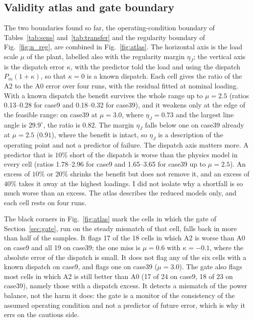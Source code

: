 \documentclass[preprint,12pt]{elsarticle}
\begin{document}
\subsection{Validity atlas and gate boundary}
\label{sec:atlas}
The two boundaries found so far, the operating-condition boundary of Tables~\ref{tab:sens} and~\ref{tab:transfer} and the regularity boundary of Fig.~\ref{fig:n_reg}, are combined in Fig.~\ref{fig:atlas}. The horizontal axis is the load scale $\mu$ of the plant, labelled also with the regularity margin $\eta_J$; the vertical axis is the dispatch error $\kappa$, with the predictor told the load and using the dispatch $P_m(1+\kappa)$, so that $\kappa=0$ is a known dispatch. Each cell gives the ratio of the A2 to the A0 error over four runs, with the residual fitted at nominal loading. With a known dispatch the benefit survives the whole range up to $\mu=2.5$ (ratios 0.13--0.28 for case9 and 0.18--0.32 for case39), and it weakens only at the edge of the feasible range: on case39 at $\mu=3.0$, where $\eta_J=0.73$ and the largest line angle is $29.9^\circ$, the ratio is $0.82$. The margin $\eta_J$ falls below one on case39 already at $\mu=2.5$ ($0.91$), where the benefit is intact, so $\eta_J$ is a description of the operating point and not a predictor of failure. The dispatch axis matters more. A predictor that is $10\%$ short of the dispatch is worse than the physics model in every cell (ratios 1.78--2.96 for case9 and 1.65--3.65 for case39 up to $\mu=2.5$). An excess of $10\%$ or $20\%$ shrinks the benefit but does not remove it, and an excess of $40\%$ takes it away at the highest loadings. I did not isolate why a shortfall is so much worse than an excess. The atlas describes the reduced models only, and each cell rests on four runs.

The black corners in Fig.~\ref{fig:atlas} mark the cells in which the gate of Section~\ref{sec:gate}, run on the steady mismatch of that cell, falls back in more than half of the samples. It flags 17 of the 18 cells in which A2 is worse than A0 on case9 and all 19 on case39; the one miss is $\mu=0.6$ with $\kappa=-0.1$, where the absolute error of the dispatch is small. It does not flag any of the six cells with a known dispatch on case9, and flags one on case39 ($\mu=3.0$). The gate also flags most cells in which A2 is still better than A0 (17 of 24 on case9, 18 of 23 on case39), namely those with a dispatch excess. It detects a mismatch of the power balance, not the harm it does: the gate is a monitor of the consistency of the assumed operating condition and not a predictor of future error, which is why it errs on the cautious side.
\end{document}
